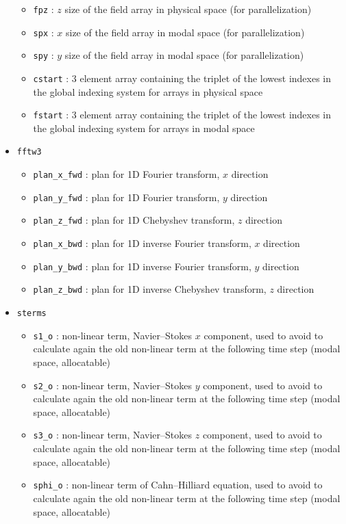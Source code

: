 \begin{itemize}
\begin{itemize}
\item \texttt{fpz} : $z$ size of the field array in physical space (for parallelization)
\item \texttt{spx} : $x$ size of the field array in modal space (for parallelization)
\item \texttt{spy} : $y$ size of the field array in modal space (for parallelization)
\item \texttt{cstart} : 3 element array containing the triplet of the lowest indexes in the global indexing system for arrays in physical space
\item \texttt{fstart} : 3 element array containing the triplet of the lowest indexes in the global indexing system for arrays in modal space
\end{itemize}
\item \texttt{fftw3}
\begin{itemize}
\item \texttt{plan\_x\_fwd} : plan for 1D Fourier transform, $x$ direction
\item \texttt{plan\_y\_fwd} : plan for 1D Fourier transform, $y$ direction
\item \texttt{plan\_z\_fwd} : plan for 1D Chebyshev transform, $z$ direction
\item \texttt{plan\_x\_bwd} : plan for 1D inverse Fourier transform, $x$ direction
\item \texttt{plan\_y\_bwd} : plan for 1D inverse Fourier transform, $y$ direction
\item \texttt{plan\_z\_bwd} : plan for 1D inverse Chebyshev transform, $z$ direction
\end{itemize}
\item \texttt{sterms}
\begin{itemize}
\item \texttt{s1\_o} : non-linear term, Navier--Stokes $x$ component, used to avoid to calculate again the old non-linear term at the following time step (modal space, allocatable)
\item \texttt{s2\_o} : non-linear term, Navier--Stokes $y$ component, used to avoid to calculate again the old non-linear term at the following time step (modal space, allocatable)
\item \texttt{s3\_o} : non-linear term, Navier--Stokes $z$ component, used to avoid to calculate again the old non-linear term at the following time step (modal space, allocatable)
\item \texttt{sphi\_o} : non-linear term of Cahn--Hilliard equation, used to avoid to calculate again the old non-linear term at the following time step (modal space, allocatable)

\end{itemize}
\end{itemize}
